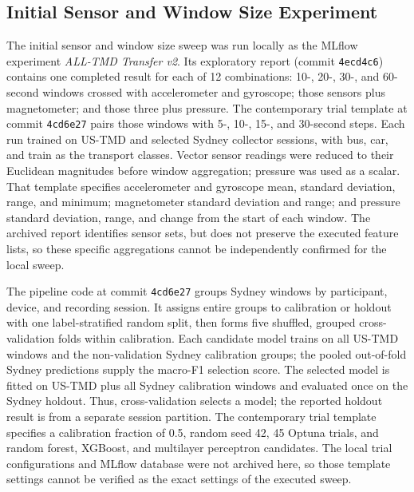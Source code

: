 \subsection{Initial Sensor and Window Size Experiment}
\label{sec:preliminary-local-methodology}

The initial sensor and window size sweep was run locally as the MLflow
experiment \emph{ALL-TMD Transfer v2}. Its exploratory report (commit
\texttt{4ecd4c6}) contains one completed result for each of 12 combinations:
10-, 20-, 30-, and
60-second windows crossed with accelerometer and gyroscope; those sensors plus
magnetometer; and those three plus pressure. The contemporary trial template
at commit \texttt{4cd6e27} pairs those windows with 5-, 10-, 15-, and
30-second steps. Each run trained on US-TMD and selected Sydney collector
sessions, with bus, car, and train as the transport classes. Vector
sensor readings were reduced to their Euclidean magnitudes before window
aggregation; pressure was used as a scalar. That template specifies
accelerometer and gyroscope mean, standard deviation, range, and minimum;
magnetometer standard deviation and
range; and pressure standard deviation, range, and change from the start of
each window. The archived report identifies sensor sets, but does not preserve
the executed feature lists, so these specific aggregations cannot be
independently confirmed for the local sweep.

The pipeline code at commit \texttt{4cd6e27} groups Sydney windows by
participant, device, and recording session. It assigns entire groups to
calibration or holdout with one label-stratified random split, then forms five shuffled, grouped
cross-validation folds within calibration. Each candidate model trains on all
US-TMD windows and the non-validation Sydney calibration groups; the pooled
out-of-fold Sydney predictions supply the macro-F1 selection score. The
selected model is fitted on US-TMD plus all Sydney calibration windows and
evaluated once on the Sydney holdout. Thus, cross-validation selects a model;
the reported holdout result is from a separate session partition. The
contemporary trial template specifies a calibration fraction of 0.5, random
seed 42, 45 Optuna trials, and random forest, XGBoost, and multilayer
perceptron candidates. The local trial configurations and MLflow database were
not archived here, so those template settings cannot be verified as the exact
settings of the executed sweep.

